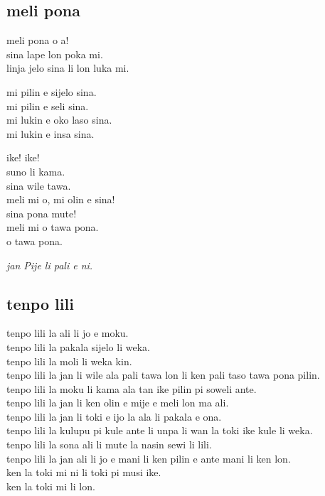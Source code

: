 \subsection{meli pona}

meli pona o a! \\
sina lape lon poka mi. \\
linja jelo sina li lon luka mi. 

mi pilin e sijelo sina. \\
mi pilin e seli sina. \\
mi lukin e oko laso sina. \\
mi lukin e insa sina. 

ike! ike! \\
suno li kama. \\
sina wile tawa. \\
meli mi o, mi olin e sina! \\
sina pona mute! \\
meli mi o tawa pona. \\
o tawa pona. 

\textit{jan Pije li pali e ni. \cite{www:Pije:01}}
%
\newpage
\subsection{tenpo lili}

tenpo lili la ali li jo e moku.     \\
tenpo lili la pakala sijelo li weka.     \\
tenpo lili la moli li weka kin.     \\
tenpo lili la jan li wile ala pali tawa lon li ken pali taso tawa pona
pilin.     \\
tenpo lili la moku li kama ala tan ike pilin pi soweli ante.     \\
tenpo lili la jan li ken olin e mije e meli lon ma ali.     \\
tenpo lili la jan li toki e ijo la ala li pakala e ona.     \\
tenpo lili la kulupu pi kule ante li unpa li wan la toki ike kule li
weka. \\
tenpo lili la sona ali li mute la nasin sewi li lili.     \\
tenpo lili la jan ali li jo e mani li ken pilin e ante mani li ken lon.
    \\
ken la toki mi ni li toki pi musi ike.     \\
ken la toki mi li lon.

